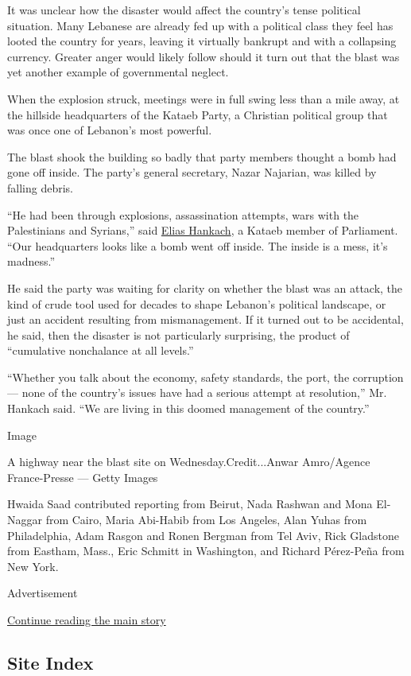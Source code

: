 It was unclear how the disaster would affect the country's tense
political situation. Many Lebanese are already fed up with a political
class they feel has looted the country for years, leaving it virtually
bankrupt and with a collapsing currency. Greater anger would likely
follow should it turn out that the blast was yet another example of
governmental neglect.

When the explosion struck, meetings were in full swing less than a mile
away, at the hillside headquarters of the Kataeb Party, a Christian
political group that was once one of Lebanon's most powerful.

The blast shook the building so badly that party members thought a bomb
had gone off inside. The party's general secretary, Nazar Najarian, was
killed by falling debris.

``He had been through explosions, assassination attempts, wars with the
Palestinians and Syrians,'' said
\href{https://www.facebook.com/EliasHankach2018/}{Elias Hankach}, a
Kataeb member of Parliament. ``Our headquarters looks like a bomb went
off inside. The inside is a mess, it's madness.''

He said the party was waiting for clarity on whether the blast was an
attack, the kind of crude tool used for decades to shape Lebanon's
political landscape, or just an accident resulting from mismanagement.
If it turned out to be accidental, he said, then the disaster is not
particularly surprising, the product of ``cumulative nonchalance at all
levels.''

``Whether you talk about the economy, safety standards, the port, the
corruption --- none of the country's issues have had a serious attempt
at resolution,'' Mr. Hankach said. ``We are living in this doomed
management of the country.''

Image

A highway near the blast site on Wednesday.Credit...Anwar Amro/Agence
France-Presse --- Getty Images

Hwaida Saad contributed reporting from Beirut, Nada Rashwan and Mona
El-Naggar from Cairo, Maria Abi-Habib from Los Angeles, Alan Yuhas from
Philadelphia, Adam Rasgon and Ronen Bergman from Tel Aviv, Rick
Gladstone from Eastham, Mass., Eric Schmitt in Washington, and Richard
Pérez-Peña from New York.

Advertisement

\protect\hyperlink{after-bottom}{Continue reading the main story}

\hypertarget{site-index}{%
\subsection{Site Index}\label{site-index}}

